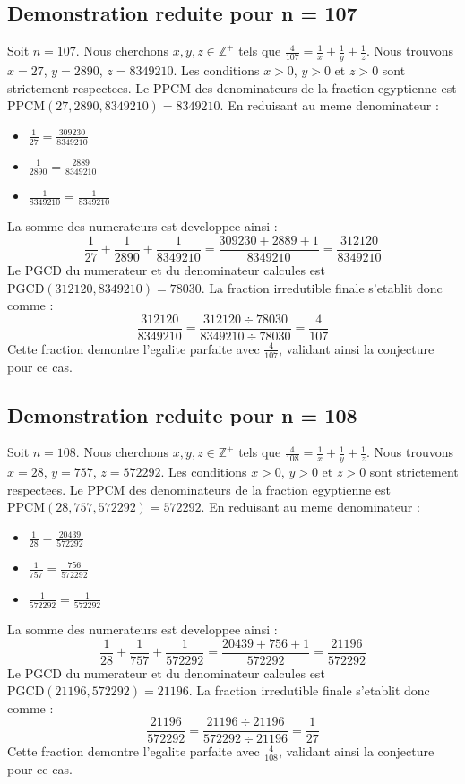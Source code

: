 \documentclass[11pt,a4paper]{article}
\begin{document}
\subsection{Demonstration reduite pour n = 107}
Soit $n = 107$. Nous cherchons $x, y, z \in \mathbb{Z}^{+}$ tels que $\frac{4}{107} = \frac{1}{x} + \frac{1}{y} + \frac{1}{z}$.
Nous trouvons $x = 27$, $y = 2890$, $z = 8349210$.
Les conditions $x > 0$, $y > 0$ et $z > 0$ sont strictement respectees.
Le PPCM des denominateurs de la fraction egyptienne est $\text{PPCM}(27, 2890, 8349210) = 8349210$.
En reduisant au meme denominateur :
\begin{itemize}
    \item $\frac{1}{27} = \frac{309230}{8349210}$
    \item $\frac{1}{2890} = \frac{2889}{8349210}$
    \item $\frac{1}{8349210} = \frac{1}{8349210}$
\end{itemize}
La somme des numerateurs est developpee ainsi :
$$ \frac{1}{27} + \frac{1}{2890} + \frac{1}{8349210} = \frac{309230 + 2889 + 1}{8349210} = \frac{312120}{8349210} $$
Le PGCD du numerateur et du denominateur calcules est $\text{PGCD}(312120, 8349210) = 78030$.
La fraction irredutible finale s'etablit donc comme :
$$ \frac{312120}{8349210} = \frac{312120 \div 78030}{8349210 \div 78030} = \frac{4}{107} $$
Cette fraction demontre l'egalite parfaite avec $\frac{4}{107}$, validant ainsi la conjecture pour ce cas.

\subsection{Demonstration reduite pour n = 108}
Soit $n = 108$. Nous cherchons $x, y, z \in \mathbb{Z}^{+}$ tels que $\frac{4}{108} = \frac{1}{x} + \frac{1}{y} + \frac{1}{z}$.
Nous trouvons $x = 28$, $y = 757$, $z = 572292$.
Les conditions $x > 0$, $y > 0$ et $z > 0$ sont strictement respectees.
Le PPCM des denominateurs de la fraction egyptienne est $\text{PPCM}(28, 757, 572292) = 572292$.
En reduisant au meme denominateur :
\begin{itemize}
    \item $\frac{1}{28} = \frac{20439}{572292}$
    \item $\frac{1}{757} = \frac{756}{572292}$
    \item $\frac{1}{572292} = \frac{1}{572292}$
\end{itemize}
La somme des numerateurs est developpee ainsi :
$$ \frac{1}{28} + \frac{1}{757} + \frac{1}{572292} = \frac{20439 + 756 + 1}{572292} = \frac{21196}{572292} $$
Le PGCD du numerateur et du denominateur calcules est $\text{PGCD}(21196, 572292) = 21196$.
La fraction irredutible finale s'etablit donc comme :
$$ \frac{21196}{572292} = \frac{21196 \div 21196}{572292 \div 21196} = \frac{1}{27} $$
Cette fraction demontre l'egalite parfaite avec $\frac{4}{108}$, validant ainsi la conjecture pour ce cas.
\end{document}
